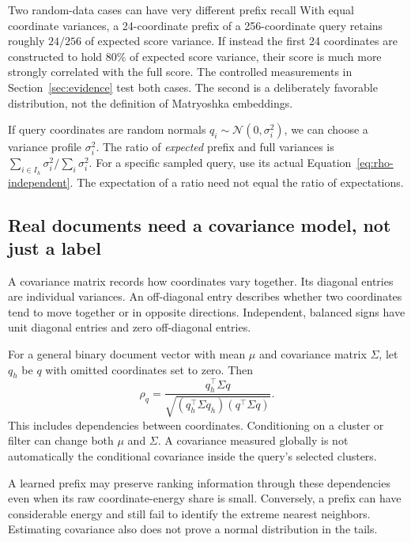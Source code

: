 \begin{examplebox}{Two random-data cases can have very different prefix recall}
With equal coordinate variances, a 24-coordinate prefix of a 256-coordinate query retains
roughly $24/256$ of expected score variance. If instead the first 24 coordinates are constructed
to hold 80\% of expected score variance, their score is much more strongly correlated with the
full score. The controlled measurements in Section~\ref{sec:evidence} test both cases. The
second is a deliberately favorable distribution, not the definition of Matryoshka embeddings.
\end{examplebox}

If query coordinates are random normals $q_i\sim\mathcal N(0,\sigma_i^2)$, we can choose a
variance profile $\sigma_i^2$. The ratio of \emph{expected} prefix and full variances is
$\sum_{i\in I_h}\sigma_i^2/\sum_i\sigma_i^2$. For a specific sampled query, use its actual
Equation~\eqref{eq:rho-independent}. The expectation of a ratio need not equal the ratio of
expectations.

\subsection{Real documents need a covariance model, not just a label}
A covariance matrix records how coordinates vary together. Its diagonal entries are individual variances. An off-diagonal entry describes whether two coordinates tend to move together or in opposite directions. Independent, balanced signs have unit diagonal entries and zero off-diagonal entries.

For a general binary document vector with mean $\mu$ and covariance matrix $\Sigma$, let
$q_h$ be $q$ with omitted coordinates set to zero. Then
\begin{equation}
\rho_q=\frac{q_h^\top\Sigma q}
 {\sqrt{(q_h^\top\Sigma q_h)(q^\top\Sigma q)}}.
\label{eq:rho-covariance}
\end{equation}
This includes dependencies between coordinates. Conditioning on a cluster or filter can
change both $\mu$ and $\Sigma$. A covariance measured globally is not automatically the
conditional covariance inside the query's selected clusters.

A learned prefix may preserve ranking information through these dependencies even when its
raw coordinate-energy share is small. Conversely, a prefix can have considerable energy and
still fail to identify the extreme nearest neighbors. Estimating covariance also does not
prove a normal distribution in the tails.


